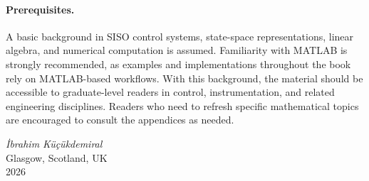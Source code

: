 \paragraph{Prerequisites.}
A basic background in SISO control systems, state-space representations, linear algebra, and numerical computation is assumed. Familiarity with MATLAB is strongly recommended, as examples and implementations throughout the book rely on MATLAB-based workflows. With this background, the material should be accessible to graduate-level readers in control, instrumentation, and related engineering disciplines. Readers who need to refresh specific mathematical topics are encouraged to consult the appendices as needed.

\vspace{1.5cm}
\begin{flushright}
\textit{\.Ibrahim K\"u\c{c}\"ukdemiral}\\
Glasgow, Scotland, UK\\
2026
\end{flushright}
